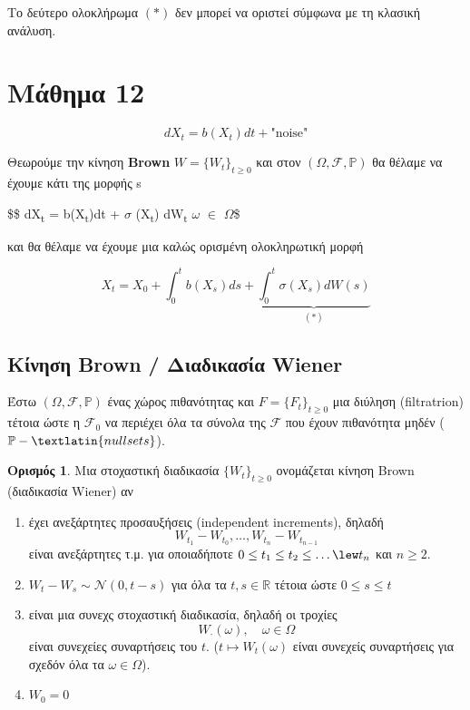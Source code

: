 \documentclass[12pt,a4paper]{article}
\theoremstyle{definition}
\numberwithin{equation}{section}
\newtheorem{orismos}{Ορισμός}
\begin{document}
Το δεύτερο ολοκλήρωμα \((*)\)  δεν μπορεί να οριστεί σύμφωνα με τη κλασική ανάλυση.
\pagebreak

\section{Μάθημα 12}
\label{sec:org2d6ffb0}

$$dX_t = b(X_t)dt + \text{"noise"}$$

Θεωρούμε την κίνηση \textbf{Brown} \(W = \{W_t\}_{t\geq 0}\) και στον \((\Omega, \mathcal{F},\mathbb{P})\) θα θέλαμε να έχουμε κάτι της μορφής
s




\$\$ dX\textsubscript{t} = b(X\textsubscript{t})dt + \(\sigma\) (X\textsubscript{t}) dW\textsubscript{t}  \qquad \(\omega\) \(\in\) \(\Omega\)\$

και θα θέλαμε να έχουμε μια καλώς ορισμένη ολοκληρωτική μορφή

$$ X_t = X_0 + \int_0^t b(X_s)ds + \underbrace{\int_0^t \sigma(X_s)dW(s)}_{(*)} $$
\subsection{Κίνηση \textlatin{Brown}  / Διαδικασία \textlatin{Wiener}}
\label{sec:orgf96855f}

Έστω \((\Omega, \mathcal{F}, \mathbb{P})\) ένας χώρος πιθανότητας και \(F = \{F_t\}_{t\geq 0}\)  μια διύληση (filtratrion) τέτοια ώστε η \(\mathcal{F}_0\) να περιέχει όλα τα σύνολα της \(\mathcal{F}\)
που έχουν πιθανότητα μηδέν (\(\mathbb{P}-\textlatin{null sets}\)).

\begin{orismos}
Μια στοχαστική διαδικασία $\{W_t\}_{t\geq 0}$ ονομάζεται κίνηση \textlatin{Brown} (διαδικασία \textlatin{Wiener}) αν
\begin{enumerate}
    \item έχει ανεξάρτητες προσαυξήσεις (\textlatin{independent increments}), δηλαδή
$$ W_{t_1} - W_{t_0} , \dots , W_{t_n} - W_{t_{n-1}} $$
είναι ανεξάρτητες τ.μ. για οποιαδήποτε $0\leq t_1 \leq t_2 \leq \dots \lew t_n $ και $n\geq 2$.
\item $W_{t} - W_s \sim \mathcal{N}(0, t-s)$ για όλα τα $t,s \in \mathbb{R}$ τέτοια ώστε $0\leq s \leq t$
\item είναι μια συνεχς στοχαστική διαδικασία, δηλαδή οι τροχίες
$$ W_{\cdot}(\omega), \quad \omega \in \Omega$$
είναι συνεχείες συναρτήσεις του $t$. ($t \mapsto W_t(\omega)$ είναι συνεχείς συναρτήσεις για σχεδόν όλα τα $\omega \in \Omega$).
\item $W_0 = 0$
\end{enumerate}
\end{orismos}
\end{document}
